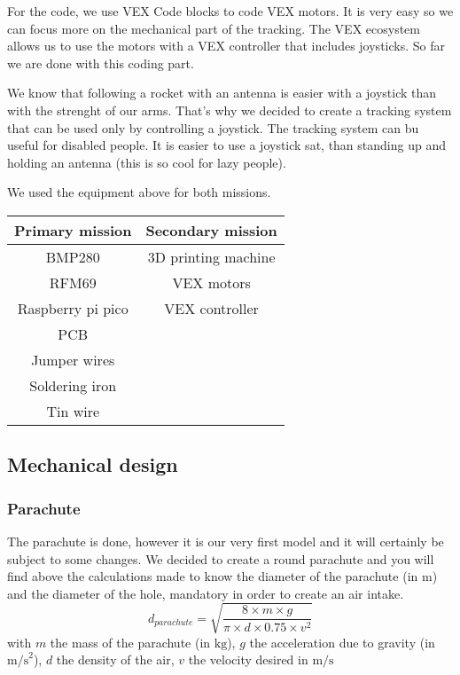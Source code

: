 \documentclass[]{article}
\begin{document}
For the code, we use VEX Code blocks to code VEX motors. It is very easy so we can focus more on the 
mechanical part of the tracking. The VEX ecosystem allows us to use the motors with a VEX controller 
that includes joysticks. So far we are done with this coding part. 

We know that following a rocket with an antenna is easier with a joystick than with the strenght of our arms. 
That's why we decided to create a tracking system that can be used only by controlling a joystick. The tracking
system can bu useful for disabled people. It is easier to use a joystick sat, than standing up and holding
an antenna (this is so cool for lazy people).

We used the equipment above for both missions. 

\begin{center}
    \begin{tabular}{|c|c|} %
        \hline %
        \textbf{Primary mission} & \textbf{Secondary mission} \\ \hline
        BMP280 & 3D printing machine \\ \hline
        RFM69 & VEX motors \\ \hline
        Raspberry pi pico & VEX controller \\ \hline
        PCB &  \\ \hline
        Jumper wires &  \\ \hline
        Soldering iron &  \\ \hline
        Tin wire &  \\ \hline
    \end{tabular}
\end{center}


        
\subsection{Mechanical design}

\subsubsection{Parachute}

The parachute is done, however it is our very first model and it will certainly be subject to some changes. 
We decided to create a round parachute and you will find above the calculations made to know the diameter of
the parachute (in m) and the diameter of the hole, mandatory in order to create an air intake. 
$$d_{parachute} = \sqrt{\frac{8\times m \times g}{\pi \times d \times 0.75 \times v^2}}$$
with \( m \) the mass of the parachute (in \( \text{kg} \)), \( g \) the acceleration due to gravity 
(in \( \text{m/s}^2 \)), \( d \) the density of the air, \( v \) the velocity desired in \( \text{m/s} \)
\end{document}
